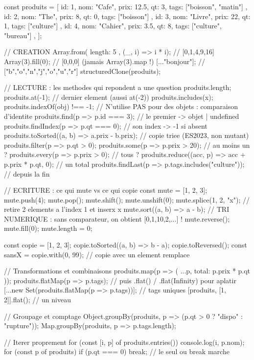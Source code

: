 \begin{codejs}
const produits = [
  { id: 1, nom: "Cafe",   prix: 12.5, qt: 3, tags: ["boisson", "matin"] },
  { id: 2, nom: "The",    prix: 8,    qt: 0, tags: ["boisson"] },
  { id: 3, nom: "Livre",  prix: 22,   qt: 1, tags: ["culture"] },
  { id: 4, nom: "Cahier", prix: 3.5,  qt: 8, tags: ["culture", "bureau"] },
];

// CREATION
Array.from({ length: 5 }, (_, i) => i * i);        // [0,1,4,9,16]
Array(3).fill(0);                                  // [0,0,0]  (jamais Array(3).map !)
[..."bonjour"];                                    // ["b","o","n","j","o","u","r"]
structuredClone(produits);

// LECTURE : les methodes qui repondent a une question
produits.length;
produits.at(-1);            // dernier element (aussi at(-2))
produits.includes(x);
produits.indexOf(obj) !== -1;    // N'utilise PAS pour des objets : comparaison d'identite
produits.find(p => p.id === 3);            // le premier -> objet | undefined
produits.findIndex(p => p.qt === 0);       // son index  -> -1 si absent
produits.toSorted((a, b) => a.prix - b.prix);   // copie triee (ES2023, non mutant)
produits.filter(p => p.qt > 0);
produits.some(p => p.prix > 20);       // au moins un ?
produits.every(p => p.prix > 0);       // tous ?
produits.reduce((acc, p) => acc + p.prix * p.qt, 0);   // un total
produits.findLast(p => p.tags.includes("culture"));    // depuis la fin

// ECRITURE : ce qui mute vs ce qui copie
const mute = [1, 2, 3];
mute.push(4); mute.pop(); mute.shift(); mute.unshift(0);
mute.splice(1, 2, "x");      // retire 2 elements a l'index 1 et inserx x
mute.sort((a, b) => a - b);  // TRI NUMERIQUE : sans comparateur, on obtient [0,1,10,2,...] !
mute.reverse(); mute.fill(0); mute.length = 0;

const copie = [1, 2, 3];
copie.toSorted((a, b) => b - a);
copie.toReversed();
const sansX = copie.with(0, 99);        // copie avec un element remplace

// Transformations et combinaisons
produits.map(p => ({ ...p, total: p.prix * p.qt }));
produits.flatMap(p => p.tags);           // puis .flat() / .flat(Infinity) pour aplatir
[...new Set(produits.flatMap(p => p.tags))];   // tags uniques
[produits, [1, 2]].flat();                // un niveau

// Groupage et comptage
Object.groupBy(produits, p => (p.qt > 0 ? "dispo" : "rupture"));
Map.groupBy(produits, p => p.tags.length);

// Iterer proprement
for (const [i, p] of produits.entries()) console.log(i, p.nom);
for (const p of produits) { if (p.qt === 0) break; }     // le seul ou break marche
\end{codejs}


